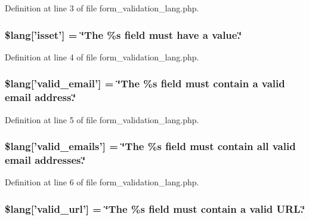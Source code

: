 Definition at line 3 of file form\-\_\-validation\-\_\-lang.\-php.

\subsubsection[{\$lang}]{\setlength{\rightskip}{0pt plus 5cm}\$lang['isset'] = \char`\"{}The \%{\bf s} field must have {\bf a} value.\char`\"{}}\label{form__validation__lang_8php_a7fcb906106dda1aee23bf5bc22024354}


Definition at line 4 of file form\-\_\-validation\-\_\-lang.\-php.

\subsubsection[{\$lang}]{\setlength{\rightskip}{0pt plus 5cm}\$lang['valid\-\_\-email'] = \char`\"{}The \%{\bf s} field must contain {\bf a} valid email address.\char`\"{}}\label{form__validation__lang_8php_ac65b0427695080708e293f1bd469a94d}


Definition at line 5 of file form\-\_\-validation\-\_\-lang.\-php.

\subsubsection[{\$lang}]{\setlength{\rightskip}{0pt plus 5cm}\$lang['valid\-\_\-emails'] = \char`\"{}The \%{\bf s} field must contain all valid email addresses.\char`\"{}}\label{form__validation__lang_8php_abf35f5d2105406bc8c673a40b31388ba}


Definition at line 6 of file form\-\_\-validation\-\_\-lang.\-php.

\subsubsection[{\$lang}]{\setlength{\rightskip}{0pt plus 5cm}\$lang['valid\-\_\-url'] = \char`\"{}The \%{\bf s} field must contain {\bf a} valid U\-R\-L.\char`\"{}}\label{form__validation__lang_8php_ad972568b7943f130b6b241a6b31d455b}


